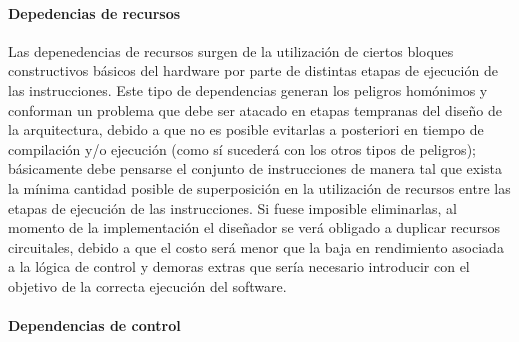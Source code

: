 \paragraph{Depedencias de recursos}
\label{par:optimizations-ilp-pipeline-resources_dependencies}

Las depenedencias de recursos surgen de la utilización de ciertos bloques 
constructivos básicos del hardware por parte de distintas etapas de ejecución 
de las instrucciones. Este tipo de dependencias generan los peligros homónimos 
y conforman un problema que debe ser atacado en etapas tempranas del diseño de 
la arquitectura, debido a que no es posible evitarlas a posteriori en tiempo de 
compilación y/o ejecución (como sí sucederá con los otros tipos de peligros); 
básicamente debe pensarse el conjunto de instrucciones de manera tal que exista 
la mínima cantidad posible de superposición en la utilización de recursos entre 
las etapas de ejecución de las instrucciones. Si fuese imposible eliminarlas, 
al momento de la implementación el diseñador se verá obligado a duplicar 
recursos circuitales, debido a que el costo será menor que la baja en 
rendimiento asociada a la lógica de control y demoras extras que sería 
necesario introducir con el objetivo de la correcta ejecución del software.

\paragraph{Dependencias de control}
\label{par:optimizations-ilp-pipeline-control_dependencies}

